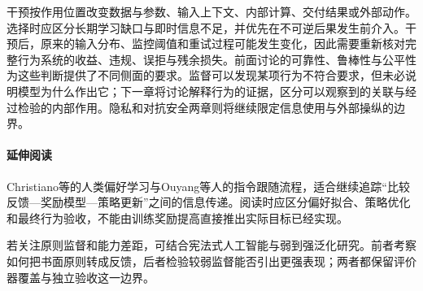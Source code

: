 干预按作用位置改变数据与参数、输入上下文、内部计算、交付结果或外部动作。选择时应区分长期学习缺口与即时信息不足，并优先在不可逆后果发生前介入。干预后，原来的输入分布、监控阈值和重试过程可能发生变化，因此需要重新核对完整行为系统的收益、违规、误拒与残余损失。前面讨论的可靠性、鲁棒性与公平性为这些判断提供了不同侧面的要求。监督可以发现某项行为不符合要求，但未必说明模型为什么作出它；下一章将讨论解释行为的证据，区分可以观察到的关联与经过检验的内部作用。隐私和对抗安全两章则将继续限定信息使用与外部操纵的边界。

\paragraph{延伸阅读}

Christiano等的人类偏好学习与Ouyang等人的指令跟随流程，适合继续追踪“比较反馈—奖励模型—策略更新”之间的信息传递。阅读时应区分偏好拟合、策略优化和最终行为验收，不能由训练奖励提高直接推出实际目标已经实现。

若关注原则监督和能力差距，可结合宪法式人工智能与弱到强泛化研究。前者考察如何把书面原则转成反馈，后者检验较弱监督能否引出更强表现；两者都保留评价器覆盖与独立验收这一边界。
